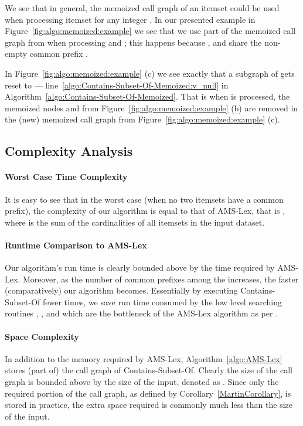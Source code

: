 \documentclass[13pt,a4paper]{article}
\begin{document}
We see that in general, the memoized call graph of an itemset  could be used when processing itemset  for any integer . In our presented example in Figure~\ref{fig:algo:memoized:example} we see that we use part of the memoized call graph from  when processing  and ; this happens because ,  and  share the non-empty common prefix .

In Figure~\ref{fig:algo:memoized:example} (c) we see exactly that a subgraph of  gets reset to  --- line~\ref{algo:Contains-Subset-Of-Memoized:v_null} in Algorithm~\ref{algo:Contains-Subset-Of-Memoized}. That is when  is processed, the memoized nodes  and  from Figure~\ref{fig:algo:memoized:example} (b) are removed in the (new) memoized call graph from Figure~\ref{fig:algo:memoized:example} (c).



\subsection{Complexity Analysis}

\paragraph{Worst Case Time Complexity}
It is easy to see that in the worst case (when no two itemsets have a common prefix), the complexity of our algorithm is equal to that of AMS-Lex, that is  , where  is the sum of the cardinalities of all itemsets in the input dataset.

\paragraph{Runtime Comparison to AMS-Lex}
Our algorithm's run time is clearly bounded above by the time required by AMS-Lex. Moreover, as the number of common prefixes among the  increases, the faster (comparatively) our algorithm becomes. Essentially by executing Contains-Subset-Of fewer times, we save run time consumed by the low level searching routines , , and  which are the bottleneck of the AMS-Lex algorithm as per \cite{BayardoPanda11}.

\paragraph{Space Complexity}
In addition to the memory required by AMS-Lex, Algorithm~\ref{algo:AMS-Lex} stores (part of) the call graph of Contains-Subset-Of. Clearly the size of the call graph is bounded above by the size of the input, denoted as . Since only the required portion of the call graph, as defined by Corollary~\ref{MartinCorollary}, is stored in practice, the extra space required is commonly much less than the size of the input.
\end{document}
